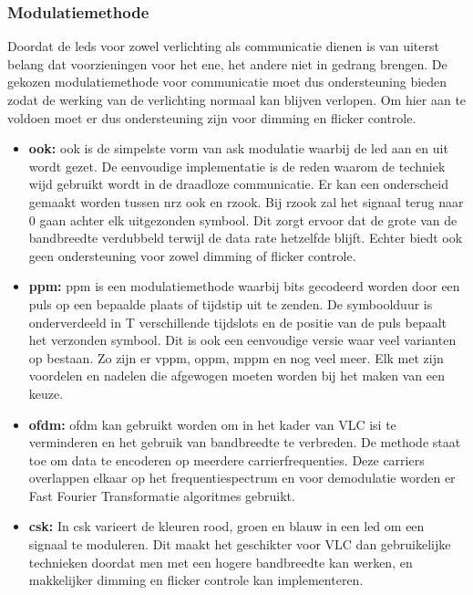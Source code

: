 		\subsubsection{Modulatiemethode}
		Doordat de \glspl{led} voor zowel verlichting als communicatie dienen is van uiterst belang dat voorzieningen voor het ene, het andere niet in gedrang brengen. De gekozen modulatiemethode voor communicatie moet dus ondersteuning bieden zodat de werking van de verlichting normaal kan blijven verlopen. Om hier aan te voldoen moet er dus ondersteuning zijn voor dimming en flicker controle.
			\begin{itemize}
				\item \textbf{\acrfull{ook}:} \gls{ook} is de simpelste vorm van \acrfull{ask} modulatie waarbij de \gls{led} aan en uit wordt gezet. De eenvoudige implementatie is de reden waarom de techniek wijd gebruikt wordt in de draadloze communicatie. Er kan een onderscheid gemaakt worden tussen \acrfull{nrz} \gls{ook} en \acrfull{rz}\gls{ook}. Bij \gls{rz}\gls{ook} zal het signaal terug naar 0 gaan achter elk uitgezonden symbool. Dit zorgt ervoor dat de grote van de bandbreedte verdubbeld terwijl de data rate hetzelfde blijft. Echter biedt \gls{ook} geen ondersteuning voor zowel dimming of flicker controle.
				
				\item \textbf{\acrfull{ppm}:} \gls{ppm} is een modulatiemethode waarbij bits gecodeerd worden door een puls op een bepaalde plaats of tijdstip uit te zenden. De symboolduur is onderverdeeld in T verschillende tijdslots en de positie van de puls bepaalt het verzonden symbool. Dit is ook een eenvoudige versie waar veel varianten op bestaan. Zo zijn er \acrfull{vppm}, \acrfull{oppm}, \acrfull{mppm} en nog veel meer. Elk met zijn voordelen en nadelen die afgewogen moeten worden bij het maken van een keuze. 
				
				\item \textbf{\acrfull{ofdm}:} \gls{ofdm} kan gebruikt worden om in het kader van VLC \acrfull{isi} te verminderen en het gebruik van bandbreedte te verbreden. De methode staat toe om data te encoderen op meerdere carrierfrequenties. Deze carriers overlappen elkaar op het frequentiespectrum en voor demodulatie worden er Fast Fourier Transformatie algoritmes gebruikt.
				
				\item \textbf{\acrfull{csk}:} In \gls{csk} varieert de kleuren rood, groen en blauw in een \gls{led} om een signaal te moduleren. Dit maakt het geschikter voor VLC dan gebruikelijke technieken doordat men met een hogere bandbreedte kan werken, en makkelijker dimming en flicker controle kan implementeren.
			\end{itemize}
		
